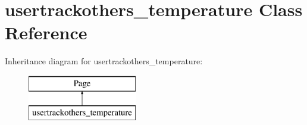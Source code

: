 \hypertarget{classusertrackothers__temperature}{\section{usertrackothers\-\_\-temperature Class Reference}
\label{classusertrackothers__temperature}
}
Inheritance diagram for usertrackothers\-\_\-temperature\-:\begin{figure}[H]
\begin{center}
\leavevmode
\includegraphics[height=2.000000cm]{classusertrackothers__temperature}
\end{center}
\end{figure}
